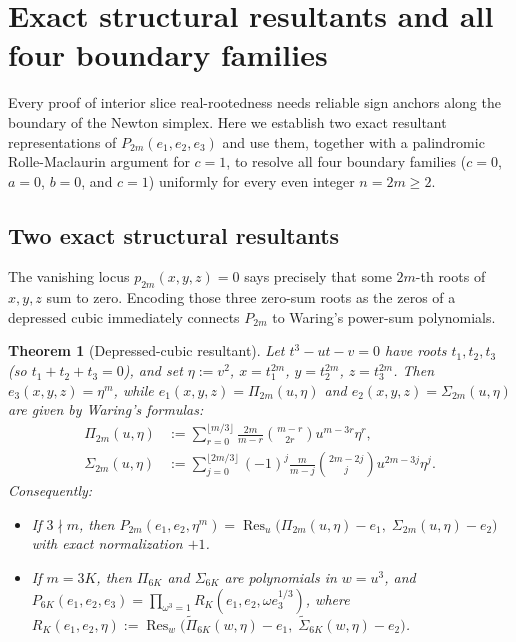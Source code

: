 \documentclass[10pt]{article}
\numberwithin{equation}{section}
\theoremstyle{plain}
\newtheorem{theorem}{Theorem}[section]
\theoremstyle{definition}
\newcommand{\1}{\mathbf{1}}
\DeclareMathOperator{\Res}{Res}
\begin{document}
\section{Exact structural resultants and all four boundary families}
\label{sec:boundaries}

Every proof of interior slice real-rootedness needs reliable sign anchors along the boundary of the Newton simplex. Here we establish two exact resultant representations of $P_{2m}(e_1, e_2, e_3)$ and use them, together with a palindromic Rolle-Maclaurin argument for $c = 1$, to resolve all four boundary families ($c = 0$, $a = 0$, $b = 0$, and $c = 1$) uniformly for every even integer $n = 2m \ge 2$.

\subsection{Two exact structural resultants}
\label{sec:resultants}

The vanishing locus $p_{2m}(x, y, z) = 0$ says precisely that some $2m$-th roots of $x, y, z$ sum to zero. Encoding those three zero-sum roots as the zeros of a depressed cubic immediately connects $P_{2m}$ to Waring's power-sum polynomials.

\begin{theorem}[Depressed-cubic resultant]\label{thm:res-cubic}
Let $t^3 - u t - v = 0$ have roots $t_1, t_2, t_3$ (so $t_1 + t_2 + t_3 = 0$), and set $\eta := v^2$, $x = t_1^{2m}$, $y = t_2^{2m}$, $z = t_3^{2m}$. Then $e_3(x, y, z) = \eta^m$, while $e_1(x, y, z) = \Pi_{2m}(u, \eta)$ and $e_2(x, y, z) = \Sigma_{2m}(u, \eta)$ are given by Waring's formulas:
\begin{subequations}\label{eq:waring-cubic}
\begin{align}
\Pi_{2m}(u, \eta) &:= \sum_{r=0}^{\lfloor m/3 \rfloor} \frac{2m}{m - r}\binom{m - r}{2r} u^{m - 3r}\eta^r, \\
\Sigma_{2m}(u, \eta) &:= \sum_{j=0}^{\lfloor 2m/3 \rfloor} (-1)^j \frac{m}{m - j}\binom{2m - 2j}{j} u^{2m - 3j}\eta^j.
\end{align}
\end{subequations}
Consequently:
\begin{itemize}[leftmargin=1.5em]
    \item If $3 \nmid m$, then $P_{2m}(e_1, e_2, \eta^m) = \Res_u\bigl(\Pi_{2m}(u, \eta) - e_1,\; \Sigma_{2m}(u, \eta) - e_2\bigr)$ with exact normalization $+1$.
    \item If $m = 3K$, then $\Pi_{6K}$ and $\Sigma_{6K}$ are polynomials in $w = u^3$, and $P_{6K}(e_1, e_2, e_3) = \prod_{\omega^3 = 1} R_K(e_1, e_2, \omega e_3^{1/3})$, where $R_K(e_1, e_2, \eta) := \Res_w\bigl(\tilde{\Pi}_{6K}(w, \eta) - e_1,\; \tilde{\Sigma}_{6K}(w, \eta) - e_2\bigr)$.
\end{itemize}
\end{theorem}
\end{document}
